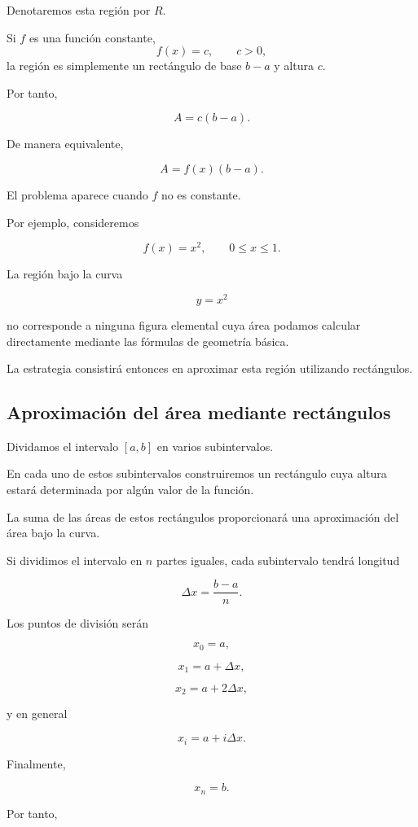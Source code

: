 \documentclass[12pt]{article}
\begin{document}
Denotaremos esta región por $R$.

Si $f$ es una función constante,
\[
f(x)=c,
\qquad c>0,
\]
la región es simplemente un rectángulo de base $b-a$ y altura $c$.

Por tanto,

\[
A=c(b-a).
\]

De manera equivalente,

\[
A=f(x)(b-a).
\]

El problema aparece cuando $f$ no es constante.

Por ejemplo, consideremos

\[
f(x)=x^2,
\qquad 0\leq x\leq1.
\]

La región bajo la curva

\[
y=x^2
\]

no corresponde a ninguna figura elemental cuya área podamos calcular
directamente mediante las fórmulas de geometría básica.

La estrategia consistirá entonces en aproximar esta región utilizando
rectángulos.

\subsection{Aproximación del área mediante rectángulos}

Dividamos el intervalo $[a,b]$ en varios subintervalos.

En cada uno de estos subintervalos construiremos un rectángulo cuya altura
estará determinada por algún valor de la función.

La suma de las áreas de estos rectángulos proporcionará una aproximación
del área bajo la curva.

Si dividimos el intervalo en $n$ partes iguales, cada subintervalo tendrá
longitud

\[
\Delta x=\frac{b-a}{n}.
\]

Los puntos de división serán

\[
x_0=a,
\]

\[
x_1=a+\Delta x,
\]

\[
x_2=a+2\Delta x,
\]

y en general

\[
x_i=a+i\Delta x.
\]

Finalmente,

\[
x_n=b.
\]

Por tanto,
\end{document}

